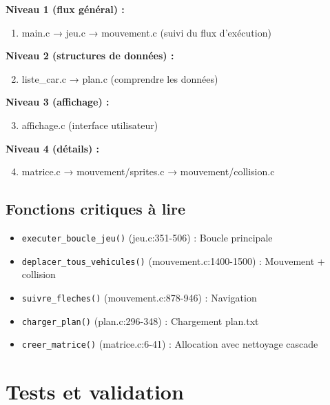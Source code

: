 \documentclass[12pt,a4paper]{article}
\begin{document}
\textbf{Niveau 1 (flux général) :}
\begin{enumerate}
    \item main.c → jeu.c → mouvement.c (suivi du flux d'exécution)
\end{enumerate}

\textbf{Niveau 2 (structures de données) :}
\begin{enumerate}
    \setcounter{enumi}{1}
    \item liste\_car.c → plan.c (comprendre les données)
\end{enumerate}

\textbf{Niveau 3 (affichage) :}
\begin{enumerate}
    \setcounter{enumi}{2}
    \item affichage.c (interface utilisateur)
\end{enumerate}

\textbf{Niveau 4 (détails) :}
\begin{enumerate}
    \setcounter{enumi}{3}
    \item matrice.c → mouvement/sprites.c → mouvement/collision.c
\end{enumerate}

\subsection{Fonctions critiques à lire}

\begin{itemize}
    \item \texttt{executer\_boucle\_jeu()} (jeu.c:351-506) : Boucle principale
    \item \texttt{deplacer\_tous\_vehicules()} (mouvement.c:1400-1500) : Mouvement + collision
    \item \texttt{suivre\_fleches()} (mouvement.c:878-946) : Navigation
    \item \texttt{charger\_plan()} (plan.c:296-348) : Chargement plan.txt
    \item \texttt{creer\_matrice()} (matrice.c:6-41) : Allocation avec nettoyage cascade
\end{itemize}


\section{Tests et validation}
\end{document}
